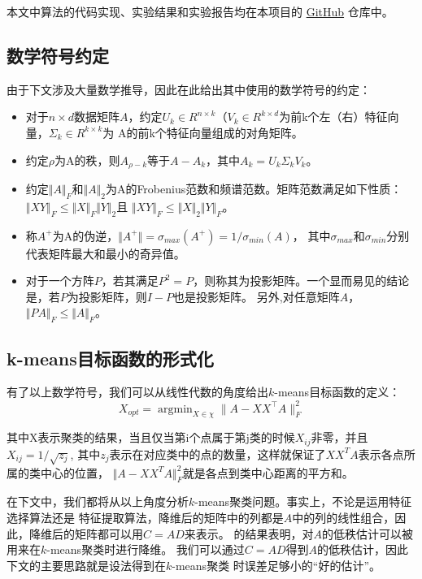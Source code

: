 \documentclass{ctexart}
\begin{document}
    本文中算法的代码实现、实验结果和实验报告均在本项目的 \href{https://github.com/fandahao17/K-means-with-dimension-reduction}{GitHub} 仓库中。
    
    \subsection{数学符号约定}
    \label{sec:symbols}
    由于下文涉及大量数学推导，因此在此给出其中使用的数学符号的约定：
    \begin{itemize}
        \item 对于$n \times d$数据矩阵$A$，约定$U_k \in R^{n \times k}$（$V_k \in R^{k \times d}$为前k个左（右）特征向量，$\Sigma_k \in R^{k \times k}$为
            A的前k个特征向量组成的对角矩阵。
        \item 约定$\rho$为A的秩，则$A_{\rho - k}$等于$A-A_k$，其中$A_k=U_k \Sigma_k V_k$。
        \item 约定$\Vert A \Vert_F$和$\Vert A \Vert_2$为A的Frobenius范数和频谱范数。矩阵范数满足如下性质：$\Vert XY \Vert_F \leq \Vert X \Vert_F \Vert Y \Vert_2$且
            $\Vert XY \Vert_F \leq \Vert X \Vert_2 \Vert Y \Vert_F$。
        \item 称$A^+$为A的伪逆，$\Vert A^+ \Vert = \sigma_{max}(A^+)=1/\sigma_{min}(A)$，
            其中$\sigma_{max}$和$\sigma_{min}$分别代表矩阵最大和最小的奇异值。
        \item 对于一个方阵$P$，若其满足$P^2=P$，则称其为投影矩阵。一个显而易见的结论是，若$P$为投影矩阵，则$I-P$也是投影矩阵。
        另外,对任意矩阵$A$，$\Vert PA \Vert_F \leq \Vert A \Vert_F$。
    \end{itemize}

    \subsection{k-means目标函数的形式化}
    有了以上数学符号，我们可以从线性代数的角度给出$k$-means目标函数的定义：
    \begin{equation*}
        X_{opt} = \mathop{\arg\min}_{X \in \chi} \| A - XX^{\top}A \|_{F}^2 \label{opt}
    \end{equation*}

    其中X表示聚类的结果，当且仅当第i个点属于第j类的时候$X_{ij}$非零，并且$X_{ij}= 1/\sqrt{z_{j}}$, 其中$z_{j}$表示在对应类中的点的数量，这样就保证了$XX^TA$表示各点所属的类中心的位置，
    $\Vert A-XX^TA \Vert_F^2$就是各点到类中心距离的平方和。

    在下文中，我们都将从以上角度分析$k$-means聚类问题。事实上，不论是运用特征选择算法还是
    特征提取算法，降维后的矩阵中的列都是$A$中的列的线性组合，因此，降维后的矩阵都可以用$C=AD$来表示。
    \cite{drineas1999clustering}的结果表明，对$A$的低秩估计可以被用来在$k$-means聚类时进行降维。
    我们可以通过$C=AD$得到$A$的低秩估计，因此下文的主要思路就是设法得到在$k$-means聚类
    时误差足够小的“好的估计”。
\end{document}
